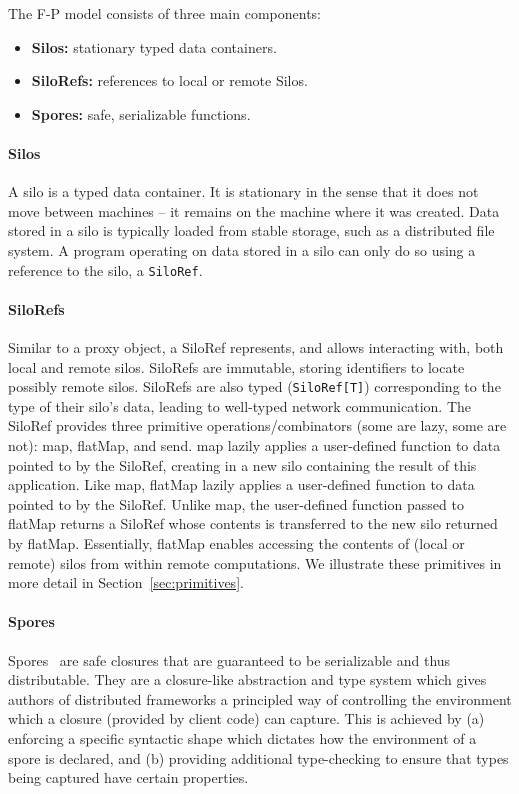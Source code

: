 \documentclass[preprint]{sigplanconf}
\theoremstyle{definition}
\theoremstyle{definition}
\begin{document}
\noindent The F-P model consists of three main components:
\begin{itemize}[noitemsep]
  \item {\bf Silos:} stationary typed data containers.
  \item {\bf SiloRefs:} references to local or remote Silos.
  \item {\bf Spores:} safe, serializable functions.
\end{itemize}
\vspace{1mm}

\paragraph{Silos}
A silo is a typed data container. It is stationary in the sense that it does
not move between machines -- it remains on the machine where it was created.
Data stored in a silo is typically loaded from stable storage, such as a
distributed file system. A program operating on data stored in a silo can only
do so using a reference to the silo, a \verb|SiloRef|.

\paragraph{SiloRefs}
Similar to a proxy object, a SiloRef represents, and allows interacting with,
both local and remote silos. SiloRefs are immutable, storing identifiers to
locate possibly remote silos. SiloRefs are also typed (\verb|SiloRef[T]|)
corresponding to the type of their silo's data, leading to well-typed network
communication. The SiloRef provides three primitive operations/combinators
(some are lazy, some are not): map, flatMap, and send. map lazily applies a
user-defined function to data pointed to by the SiloRef, creating in a new
silo containing the result of this application. Like map, flatMap lazily
applies a user-defined function to data pointed to by the SiloRef. Unlike map,
the user-defined function passed to flatMap returns a SiloRef whose contents
is transferred to the new silo returned by flatMap. Essentially, flatMap
enables accessing the contents of (local or remote) silos from within remote
computations. We illustrate these primitives in more detail in Section~\ref{sec:primitives}.

\paragraph{Spores}

Spores~\cite{Spores} are safe closures that are guaranteed to be serializable
and thus distributable. They are a closure-like abstraction and type system
which gives authors of distributed frameworks a principled way of controlling
the environment which a closure (provided by client code) can capture. This is
achieved by (a) enforcing a specific syntactic shape which dictates how the
environment of a spore is declared, and (b) providing additional type-checking
to ensure that types being captured have certain properties.
\end{document}
